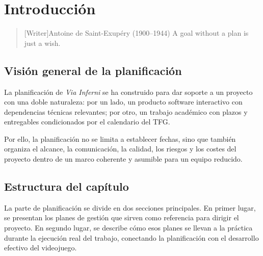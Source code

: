 \chapter{Introducción}

\begin{quotation}[Writer]{Antoine de Saint-Exupéry (1900--1944)}
A goal without a plan is just a wish.
\end{quotation}

\begin{abstract}
Este capítulo introduce la planificación del proyecto y explica cómo se estructura el
bloque dedicado a la gestión. El objetivo es separar con claridad la definición de los
planes de gestión de su ejecución posterior.
\end{abstract}

\section{Visión general de la planificación}
La planificación de \textit{Via Inferni} se ha construido para dar soporte a un proyecto
con una doble naturaleza: por un lado, un producto software interactivo con dependencias
técnicas relevantes; por otro, un trabajo académico con plazos y entregables
condicionados por el calendario del TFG.

Por ello, la planificación no se limita a establecer fechas, sino que también organiza
el alcance, la comunicación, la calidad, los riesgos y los costes del proyecto dentro de
un marco coherente y asumible para un equipo reducido.

\section{Estructura del capítulo}
La parte de planificación se divide en dos secciones principales. En primer lugar, se
presentan los planes de gestión que sirven como referencia para dirigir el proyecto. En
segundo lugar, se describe cómo esos planes se llevan a la práctica durante la
ejecución real del trabajo, conectando la planificación con el desarrollo efectivo del
videojuego.
